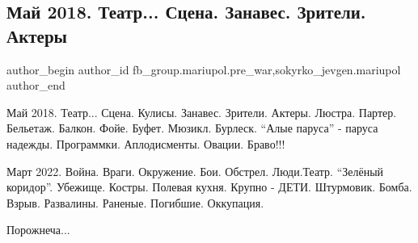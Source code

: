  
 
 
 
 

\subsection{Май 2018. Театр... Сцена. Занавес. Зрители. Актеры}
\label{sec:14_02_2023.fb.fb_group.mariupol.pre_war.1.mai_2018__teatr__sts}
 
\ifcmt
 author_begin
   author_id fb_group.mariupol.pre_war,sokyrko_jevgen.mariupol
 author_end
\fi

Май 2018. Театр... Сцена. Кулисы. Занавес. Зрители. Актеры. Люстра. Партер.
Бельетаж. Балкон. Фойе. Буфет. Мюзикл. Бурлеск. \enquote{Алые паруса} - паруса надежды.
Программки. Аплодисменты. Овации. Браво!!!

Март 2022. Война. Враги. Окружение. Бои. Обстрел. Люди.Театр. \enquote{Зелёный
коридор}. Убежище. Костры. Полевая кухня. Крупно - ДЕТИ. Штурмовик. Бомба.
Взрыв. Развалины. Раненые. Погибшие. Оккупация.

Порожнеча...

